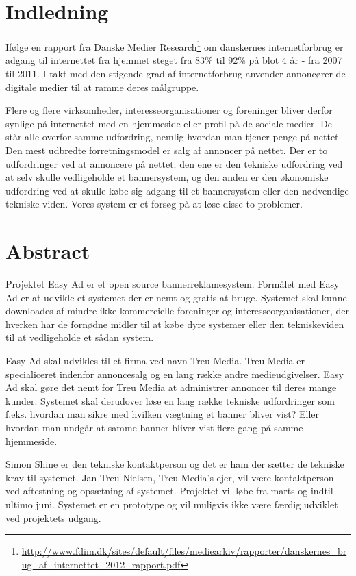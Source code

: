 \documentclass[a4paper,12pt]{article}
\begin{document}
\section{Indledning}
Ifølge en rapport fra Danske Medier Research\footnote{\url{ http://www.fdim.dk/sites/default/files/mediearkiv/rapporter/danskernes\_brug\_af\_internettet\_2012\_rapport.pdf}} om danskernes internetforbrug er adgang til internettet fra hjemmet steget fra 83\% til 92\% på blot 4 år - fra 2007 til 2011. I takt med den stigende grad af internetforbrug anvender annoncører de digitale medier til at ramme deres målgruppe.

Flere og flere virksomheder, interesseorganisationer og foreninger bliver derfor synlige på internettet med en hjemmeside eller profil på de sociale medier. De står alle overfor samme udfordring, nemlig hvordan man tjener penge på nettet. Den mest udbredte forretningsmodel er salg af annoncer på nettet. Der er to udfordringer ved at annoncere på nettet; den ene er den tekniske udfordring ved at selv skulle vedligeholde et bannersystem, og den anden er den økonomiske udfordring ved at skulle købe sig adgang til et bannersystem eller den nødvendige tekniske viden. Vores system er et forsøg på at løse disse to problemer.

\section{Abstract}

Projektet Easy Ad er et open source bannerreklamesystem. Formålet med Easy Ad er at udvikle et systemet der er nemt og gratis at bruge. Systemet skal kunne downloades af mindre ikke-kommercielle foreninger og interesseorganisationer, der hverken har de fornødne midler til at købe dyre systemer eller den tekniskeviden til at vedligeholde et sådan system.

Easy Ad skal udvikles til et firma ved navn Treu Media. Treu Media er specialiceret indenfor annoncesalg og en lang række andre medieudgivelser. Easy Ad skal gøre det nemt for Treu Media at administrer annoncer til deres mange kunder. Systemet skal derudover løse en lang række tekniske udfordringer som f.eks. hvordan man sikre med hvilken vægtning et banner bliver vist? Eller hvordan man undgår at samme banner bliver vist flere gang på samme hjemmeside.

Simon Shine er den tekniske kontaktperson og det er ham der sætter de tekniske krav til systemet. Jan Treu-Nielsen, Treu Media's ejer, vil være kontaktperson ved aftestning og opsætning af systemet. Projektet vil løbe fra marts og indtil ultimo juni. Systemet er en prototype og vil muligvis ikke være færdig udviklet ved projektets udgang. 
\end{document}
